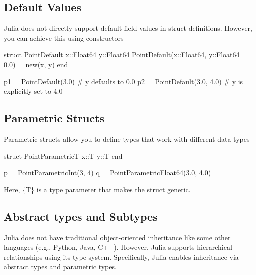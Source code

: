 \documentclass{report}
\begin{document}
     \bigbreak \noindent 
     \subsection{Default Values}
     \bigbreak \noindent 
     Julia does not directly support default field values in struct definitions. However, you can achieve this using constructors
     \bigbreak \noindent 
     \begin{jlcode}
         struct PointDefault
             x::Float64
             y::Float64
             PointDefault(x::Float64, y::Float64 = 0.0) = new(x, y)
         end

         p1 = PointDefault(3.0)  # y defaults to 0.0
         p2 = PointDefault(3.0, 4.0)  # y is explicitly set to 4.0
     \end{jlcode}

     \bigbreak \noindent 
     \subsection{Parametric Structs}
     \bigbreak \noindent 
     Parametric structs allow you to define types that work with different data types
     \bigbreak \noindent 
     \begin{jlcode}
         struct PointParametric{T}
             x::T
             y::T
         end

         p = PointParametric{Int}(3, 4)
         q = PointParametric{Float64}(3.0, 4.0)
     \end{jlcode}
     \bigbreak \noindent 
     Here, \{T\} is a type parameter that makes the struct generic.

     \bigbreak \noindent 
     \subsection{Abstract types and Subtypes}
     \bigbreak \noindent 
     Julia does not have traditional object-oriented inheritance like some other languages (e.g., Python, Java, C++). However, Julia supports hierarchical relationships using its type system. Specifically, Julia enables inheritance via abstract types and parametric types.
     \bigbreak \noindent 
\end{document}
